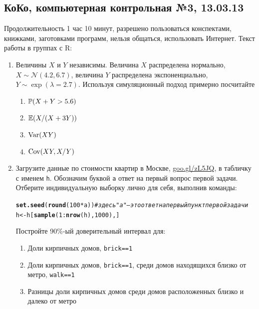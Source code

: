 \documentclass[12pt, a4paper]{article}\usepackage[]{graphicx}\usepackage[]{color}
\makeatletter
\newcommand{\hlnum}[1]{\textcolor[rgb]{0.686,0.059,0.569}{#1}}%
\newcommand{\hlcom}[1]{\textcolor[rgb]{0.678,0.584,0.686}{\textit{#1}}}%
\newcommand{\hlopt}[1]{\textcolor[rgb]{0,0,0}{#1}}%
\newcommand{\hlstd}[1]{\textcolor[rgb]{0.345,0.345,0.345}{#1}}%
\newcommand{\hlkwb}[1]{\textcolor[rgb]{0.69,0.353,0.396}{#1}}%
\newcommand{\hlkwd}[1]{\textcolor[rgb]{0.737,0.353,0.396}{\textbf{#1}}}%
\newenvironment{kframe}{%
 \def\at@end@of@kframe{}%
 \ifinner\ifhmode%
  \def\at@end@of@kframe{\end{minipage}}%
  \begin{minipage}{\columnwidth}%
 \fi\fi%
 \def\FrameCommand##1{\hskip\@totalleftmargin \hskip-\fboxsep
 \colorbox{shadecolor}{##1}\hskip-\fboxsep
     \hskip-\linewidth \hskip-\@totalleftmargin \hskip\columnwidth}%
 \MakeFramed {\advance\hsize-\width
   \@totalleftmargin\z@ \linewidth\hsize
   \@setminipage}}%
 {\par\unskip\endMakeFramed%
 \at@end@of@kframe}
\newenvironment{knitrout}{}{} %
\newcommand{\cN}{\mathcal{N}}
\makeatother
\begin{document}
\subsection{КоКо, компьютерная контрольная №3, 13.03.13}

Продолжительность 1 час 10 минут, разрешено пользоваться конспектами, книжками, заготовками программ, нельзя общаться, использовать Интернет. Текст работы в группах с R:

\begin{enumerate}
\item Величины $X$ и $Y$ независимы. Величина $X$ распределена нормально, $X\sim \cN(4.2,6.7)$, величина $Y$ распределена экспоненциально, $Y\sim \exp(\lambda=2.7)$. Используя симуляционный подход примерно посчитайте

\begin{enumerate}
\item $\P(X+Y>5.6)$
\item $\E(X/(X+3Y))$
\item $\Var(XY)$
\item $\Cov(XY,X/Y)$
\end{enumerate}

\item Загрузите данные по стоимости квартир в Москве, \href{http://goo.gl/zL5JQ}{goo.gl/zL5JQ}, в табличку с именем \verb|h|. Обозначим буквой \verb|a| ответ на первый вопрос первой задачи. Отберите индивидуальную выборку лично для себя, выполнив команды:
\begin{knitrout}
\color{fgcolor}\begin{kframe}
\begin{alltt}
\hlkwd{set.seed}\hlstd{(}\hlkwd{round}\hlstd{(}\hlnum{100} \hlopt{*} \hlstd{a))} \hlcom{# здесь "a" — это ответ на первый пункт первой задачи}
\hlstd{h} \hlkwb{<-} \hlstd{h[}\hlkwd{sample}\hlstd{(}\hlnum{1}\hlopt{:}\hlkwd{nrow}\hlstd{(h),} \hlnum{1000}\hlstd{), ]}
\end{alltt}
\end{kframe}
\end{knitrout}

Постройте 90\%-ый доверительный интервал для:
\begin{enumerate}
\item Доли кирпичных домов, \verb|brick==1|
\item Доли кирпичных домов, \verb|brick==1|, среди домов находящихся близко от метро,  \verb|walk==1|
\item Разницы доли кирпичных домов среди домов расположенных близко и далеко от метро
\end{enumerate}



\end{enumerate}
\end{document}
